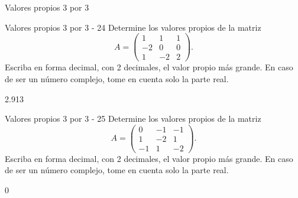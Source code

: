 \documentclass[a4,11pt]{aleph-notas}
\begin{document}
\begin{quiz}{Valores propios 3 por 3}
\begin{numerical}[tolerance=0.01]%
    {Valores propios 3 por 3 - 24}
    Determine los valores propios de la matriz
    \[
    A = \begin{pmatrix}
    1 & 1 & 1 \\
    -2 & 0 & 0 \\
    1 & -2 & 2
    \end{pmatrix}.
    \]
    Escriba en forma decimal, con 2 decimales, el valor propio más grande. En caso de ser un número complejo, tome en cuenta solo la parte real.
    \item[] 2.913
\end{numerical}

\begin{numerical}[tolerance=0.01]%
    {Valores propios 3 por 3 - 25}
    Determine los valores propios de la matriz
    \[
    A = \begin{pmatrix}
    0 & -1 & -1 \\
    1 & -2 & 1 \\
    -1 & 1 & -2
    \end{pmatrix}.
    \]
    Escriba en forma decimal, con 2 decimales, el valor propio más grande. En caso de ser un número complejo, tome en cuenta solo la parte real.
    \item[] 0
\end{numerical}



\end{quiz}
\end{document}
